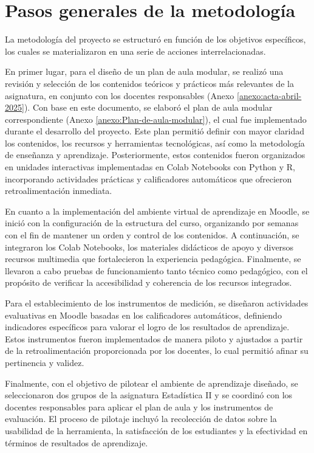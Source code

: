 \documentclass[letter,oneside,12pt,spanish]{report}
\begin{document}
\section{Pasos generales de la metodología}

La metodología del proyecto se estructuró en función de los objetivos específicos, los cuales se materializaron en una serie de acciones interrelacionadas.

En primer lugar, para el diseño de un plan de aula modular, se realizó una revisión y selección de los contenidos teóricos y prácticos más relevantes de la asignatura, en conjunto con los docentes responsables (Anexo \ref{anexo:acta-abril-2025}). Con base en este documento, se elaboró el plan de aula modular correspondiente (Anexo \ref{anexo:Plan-de-aula-modular}), el cual fue implementado durante el desarrollo del proyecto. Este plan permitió definir con mayor claridad los contenidos, los recursos y herramientas tecnológicas, así como la metodología de enseñanza y aprendizaje. Posteriormente, estos contenidos fueron organizados en unidades interactivas implementadas en Colab Notebooks con Python y R, incorporando actividades prácticas y calificadores automáticos que ofrecieron retroalimentación inmediata.

En cuanto a la implementación del ambiente virtual de aprendizaje en Moodle, se inició con la configuración de la estructura del curso, organizando por semanas con el fin de mantener un orden y control de los contenidos. A continuación, se integraron los Colab Notebooks, los materiales didácticos de apoyo y diversos recursos multimedia que fortalecieron la experiencia pedagógica. Finalmente, se llevaron a cabo pruebas de funcionamiento tanto técnico como pedagógico, con el propósito de verificar la accesibilidad y coherencia de los recursos integrados.

Para el establecimiento de los instrumentos de medición, se diseñaron actividades evaluativas en Moodle basadas en los calificadores automáticos, definiendo indicadores específicos para valorar el logro de los resultados de aprendizaje. Estos instrumentos fueron implementados de manera piloto y ajustados a partir de la retroalimentación proporcionada por los docentes, lo cual permitió afinar su pertinencia y validez.

Finalmente, con el objetivo de pilotear el ambiente de aprendizaje diseñado, se seleccionaron dos grupos de la asignatura Estadística II y se coordinó con los docentes responsables para aplicar el plan de aula y los instrumentos de evaluación. El proceso de pilotaje incluyó la recolección de datos sobre la usabilidad de la herramienta, la satisfacción de los estudiantes y la efectividad en términos de resultados de aprendizaje.
\end{document}

